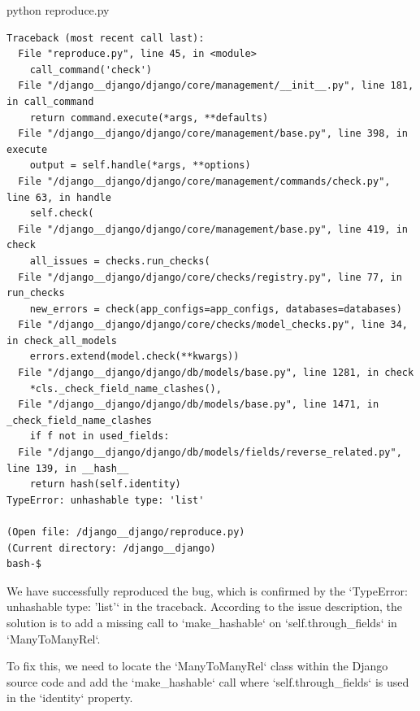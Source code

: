 {\begin{agentbox}
\hrulefill
\begin{CodeVerbatim}[breaklines=true, breakanywhere=true]
python reproduce.py
\end{CodeVerbatim}
\end{agentbox}
\begin{observationbox}\begin{Verbatim}[breaklines=true, breakanywhere=true]
Traceback (most recent call last):
  File "reproduce.py", line 45, in <module>
    call_command('check')
  File "/django__django/django/core/management/__init__.py", line 181, in call_command
    return command.execute(*args, **defaults)
  File "/django__django/django/core/management/base.py", line 398, in execute
    output = self.handle(*args, **options)
  File "/django__django/django/core/management/commands/check.py", line 63, in handle
    self.check(
  File "/django__django/django/core/management/base.py", line 419, in check
    all_issues = checks.run_checks(
  File "/django__django/django/core/checks/registry.py", line 77, in run_checks
    new_errors = check(app_configs=app_configs, databases=databases)
  File "/django__django/django/core/checks/model_checks.py", line 34, in check_all_models
    errors.extend(model.check(**kwargs))
  File "/django__django/django/db/models/base.py", line 1281, in check
    *cls._check_field_name_clashes(),
  File "/django__django/django/db/models/base.py", line 1471, in _check_field_name_clashes
    if f not in used_fields:
  File "/django__django/django/db/models/fields/reverse_related.py", line 139, in __hash__
    return hash(self.identity)
TypeError: unhashable type: 'list'

(Open file: /django__django/reproduce.py)
(Current directory: /django__django)
bash-$
\end{Verbatim}
\end{observationbox}
\begin{agentbox}
We have successfully reproduced the bug, which is confirmed by the `TypeError: unhashable type: 'list'` in the traceback. According to the issue description, the solution is to add a missing call to `make\_hashable` on `self.through\_fields` in `ManyToManyRel`.



To fix this, we need to locate the `ManyToManyRel` class within the Django source code and add the `make\_hashable` call where `self.through\_fields` is used in the `identity` property.




\end{agentbox}}
